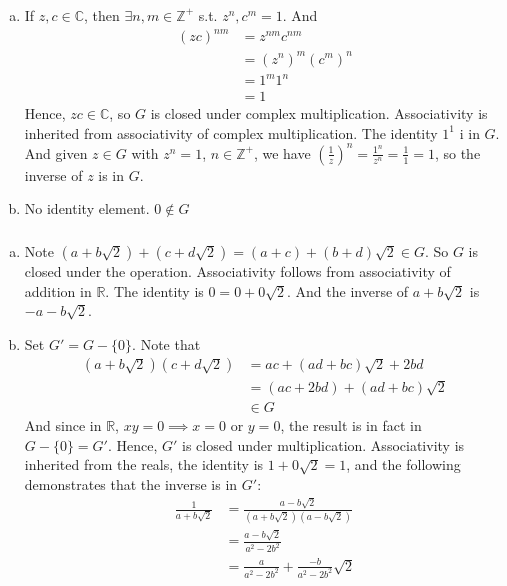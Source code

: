 \documentclass{article}
\newcommand{\ints}{\mathbb{Z}}
\newcommand{\reals}{\mathbb{R}}
\newcommand{\comps}{\mathbb{C}}
\newcommand{\set}[1]{ \{ #1 \} }
\begin{document}
\subsubsection{}
\begin{enumerate}[(a)]
\item If $z,c \in \comps$, then $\exists n,m \in \ints^+$ s.t. $z^n,c^m=1$.
And 
\begin{align*}
(zc)^{nm} &= z^{nm}c^{nm}\\
&= (z^n)^m(c^m)^n\\
&= 1^m 1^n\\
&= 1
\end{align*}
Hence, $zc \in \comps$, so $G$ is closed under complex multiplication. Associativity is inherited from associativity of complex multiplication. The identity $1^1$ i in $G$. And given $z \in G$ with $z^n =1$, $n \in \ints^+$, we have $(\frac{1}{z})^n = \frac{1^n}{z^n} = \frac{1}{1} = 1$, so the inverse of $z$ is in $G$.
\item No identity element. $0 \notin G$
\end{enumerate}
\subsubsection{}
\begin{enumerate}[(a)]

\item Note $(a + b\sqrt{2}) + (c+d\sqrt{2}) = (a+c) + (b+d)\sqrt{2} \in G$. So $G$ is closed under the operation. Associativity follows from associativity of addition in $\reals$. The identity is $0 = 0 + 0\sqrt{2}$. And the inverse of $a+b\sqrt{2}$ is $-a -b\sqrt{2}$.

\item Set $G' = G - \set{0}$. Note that
\begin{align*}
(a+b\sqrt{2})(c+d\sqrt 2) &= ac + (ad+bc)\sqrt 2 + 2bd\\
&= (ac + 2bd) + (ad+bc)\sqrt 2\\
&\in G
\end{align*}
And since in $\reals$, $xy = 0 \implies x = 0 \mbox{ or } y=0$, the result is in fact in $G-\set{0} = G'$. Hence, $G'$ is closed under multiplication. Associativity is inherited from the reals, the identity is $1 + 0\sqrt 2 = 1$, and the following demonstrates that the inverse is in $G'$:
\begin{align*}
\frac{1}{a+b\sqrt 2} &= \frac{a-b\sqrt 2}{(a+b\sqrt 2)(a-b\sqrt 2)}\\
&= \frac{a-b\sqrt 2}{a^2-2b^2}\\
&= \frac{a}{a^2-2b^2} + \frac{-b}{a^2-2b^2}\sqrt{2}
\end{align*}
\end{enumerate}
\end{document}
